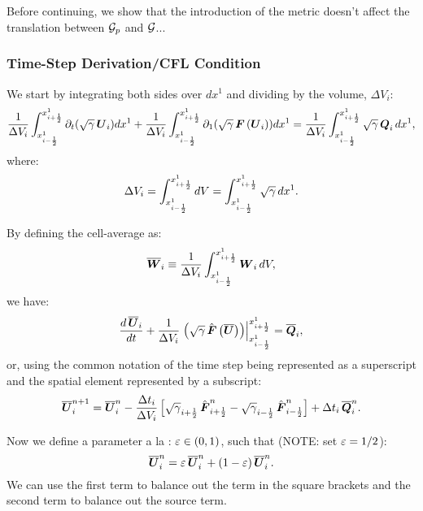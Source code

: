 \documentclass[10pt,preprint]{aastex}
\begin{document}
Before continuing, we show that the introduction of the metric doesn't affect the translation between $\cG_{p}$ and $\cG$...

\subsubsection{Time-Step Derivation/CFL Condition}
We start by integrating both sides over $dx^{1}$ and dividing by the volume, $\Delta V_{i}$:
\begin{equation}
    \f{1}{\Delta V_{i}}\int_{x^{1}_{\imh}}^{x^{1}_{\iph}}\pd{\left(\sqrtgm\,\bU_{i}\right)}{t}dx^{1}+\f{1}{\Delta V_{i}}\int_{x^{1}_{\imh}}^{x^{1}_{\iph}}\pd{\left(\sqrtgm\,\bF\left(\bU_{i}\right)\right)}{1}dx^{1}=\f{1}{\Delta V_{i}}\int_{x^{1}_{\imh}}^{x^{1}_{\iph}}\sqrtgm\,\bQ_{i}\,dx^{1},
\end{equation}
where:
\begin{equation}
    \Delta V_{i}=\int_{x^{1}_{\imh}}^{x^{1}_{\iph}}dV=\int_{x^{1}_{\imh}}^{x^{1}_{\iph}}\sqrtgm\,dx^{1}.
\end{equation}

By defining the cell-average as:
\begin{equation}
    \ol{\bW}_{i}\equiv\f{1}{\Delta V_{i}}\int_{x^{1}_{\imh}}^{x^{1}_{\iph}}\bW_{i}\,dV,
\end{equation}
we have:
\begin{equation}
    \f{d\,\ol{\bU}_{i}}{dt}+\f{1}{\Delta V_{i}}\left.\left(\sqrtgm\,\hat{\bF}\left(\ol{\bU}\right)\right)\right|^{x^{1}_{\iph}}_{x^{1}_{\imh}}=\ol{\bQ}_{i},
\end{equation}
or, using the common notation of the time step being represented as a superscript and the spatial element represented by a subscript:
\begin{equation}
    \ol{\bU}^{n+1}_{i}=\ol{\bU}^{n}_{i}-\f{\Delta t_{i}}{\Delta V_{i}}\left[\sqrtgm_{\iph}\,\hat{\bF}^{n}_{\iph}-\sqrtgm_{\imh}\,\hat{\bF}^{n}_{\imh}\right]+\Delta t_{i}\,\ol{\bQ}^{n}_{i}.
\end{equation}

Now we define a parameter a la \citet{ZS2011b}: $\ve\in\left(0,1\right)$, such that (NOTE: \citet{ZS2011b} set $\ve=1/2$):
\begin{equation}
    \ol{\bU}^{n}_{i}=\ve\,\ol{\bU}^{n}_{i}+\left(1-\ve\right)\ol{\bU}^{n}_{i}.
\end{equation}
We can use the first term to balance out the term in the square brackets and the second term to balance out the source term.
\end{document}
